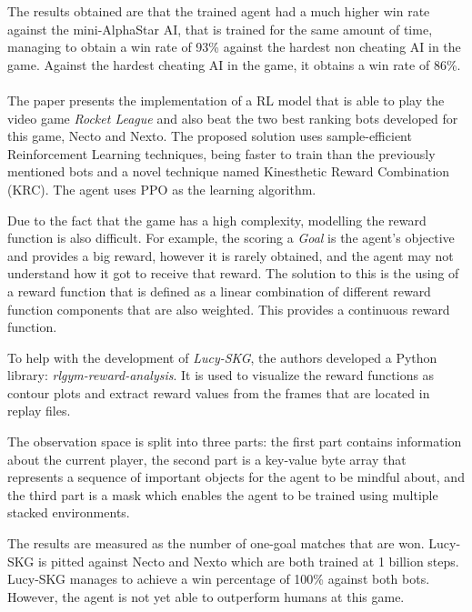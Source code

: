 The results obtained are that the trained agent had a much higher win rate against the mini-AlphaStar AI, that is trained for the same amount of time, managing to obtain a win rate of 93\% against the hardest non cheating AI in the game. Against the hardest cheating AI in the game, it obtains a win rate of 86\%.



\paragraph{}
The paper \cite{moschopoulos2023lucyskgrocketleague} presents the implementation of a RL model that is able to play the video game \emph{Rocket League} and also beat the two best ranking bots developed for this game, Necto and Nexto. The proposed solution uses sample-efficient Reinforcement Learning techniques, being faster to train than the previously mentioned bots and a novel technique named Kinesthetic Reward Combination (KRC). The agent uses PPO as the learning algorithm.

Due to the fact that the game has a high complexity, modelling the reward function is also difficult. For example, the scoring a \emph{Goal} is the agent's objective and provides a big reward, however it is rarely obtained, and the agent may not understand how it got to receive that reward. The solution to this is the using of a reward function that is defined as a linear combination of different reward function components that are also weighted. This provides a continuous reward function.

To help with the development of \emph{Lucy-SKG}, the authors developed a Python library: \emph{rlgym-reward-analysis}. It is used to visualize the reward functions as contour plots and extract reward values from the frames that are located in replay files.

The observation space is split into three parts: the first part contains information about the current player, the second part is a key-value byte array that represents a sequence of important objects for the agent to be mindful about, and the third part is a mask which enables the agent to be trained using multiple stacked environments.

The results are measured as the number of one-goal matches that are won. Lucy-SKG is pitted against Necto and Nexto which are both trained at 1 billion steps. Lucy-SKG manages to achieve a win percentage of 100\% against both bots. However, the agent is not yet able to outperform humans at this game.



